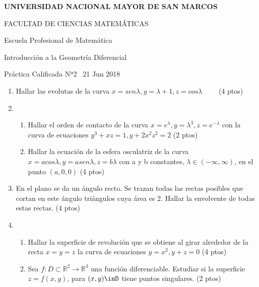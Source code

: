 \documentclass{article}
\begin{document}
\begin{center}
  \bfseries\large
  UNIVERSIDAD NACIONAL MAYOR DE SAN MARCOS
  
  FACULTAD DE CIENCIAS MATEMÁTICAS
  
  Escuela Profesional de Matemática
  
  Introducción a la Geometría Diferencial 
  
  Práctica Calificada Nª2 \qquad \  21 Jun 2018

  \bigskip

\end{center}

\noindent

\begin{enumerate}
  \item 
  Hallar las evolutas de la curva $x=sen\lambda,  y=\lambda+1,  z=cos\lambda \qquad$  (4 ptos)
  \item 
  \begin{enumerate}
    \item
    Hallar el orden de contacto de la curva $x=e^{\lambda} , y=\lambda^3, z=e^{-\lambda}$ con la curva de ecuaciones $y^3+xz=1, y+2x^2z^2=2$ \qquad (2 ptos)
    \item
    Hallar la ecuación de la esfera osculatriz de la curva $x=acos\lambda, y=asen\lambda, z=b\lambda$ con a y b constantes, $\lambda \in (-\infty,\infty)$, en el punto $(a,0,0)$ \qquad (4 ptos)
  \end{enumerate}
  \item 
  En el plano se da un ángulo recto. Se trazan todas las rectas posibles que cortan en este ángulo triángulos cuya área es 2. Hallar la envolvente de todas estas rectas. \qquad (4 ptos)
  \item
  \begin{enumerate}
      \item 
      Hallar la superficie de revolución que se obtiene al girar alrededor de la recta $x=y=z$ la curva de ecuaciones $y=x^2, y+z=0$ \quad (4 ptos)
      \item
      Sea $f:D\subset \mathbb{R}^2\rightarrow\mathbb{R}^3$ una función diferenciable. Estudiar si la superficie $z=f(x,y)$, para $(x,y)\inD$ tiene puntos singulares. \quad (2 ptos)
      
  \end{enumerate}
\end{enumerate}
\end{document}

